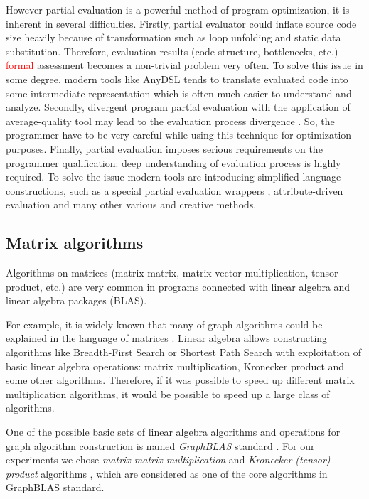 \documentclass[conference]{IEEEtran}
\begin{document}
However partial evaluation is a powerful method of program optimization, it is inherent in several difficulties. Firstly, partial evaluator could inflate source code size heavily because of transformation such as loop unfolding and static data substitution. Therefore, evaluation results (code structure, bottlenecks, etc.) \textcolor{red}{formal} assessment becomes a non-trivial problem very often. To solve this issue in some degree, modern tools like AnyDSL \cite{leissa2018anydsl} tends to translate evaluated code into some intermediate representation which is often much easier to understand and analyze. Secondly, divergent program partial evaluation with the application of average-quality tool may lead to the evaluation process divergence \cite{jones1993partial}. So, the programmer have to be very careful while using this technique for optimization purposes. Finally, partial evaluation imposes serious requirements on the programmer qualification: deep understanding of evaluation process is highly required. To solve the issue modern tools are introducing simplified language constructions, such as a special partial evaluation wrappers \cite{leissa2018anydsl}, attribute-driven evaluation \cite{10.1007/978-3-319-74313-4_27} and many other various and creative methods.

\subsection{Matrix algorithms}

Algorithms on matrices (matrix-matrix, matrix-vector multiplication, tensor product, etc.) are very common in programs connected with linear algebra and linear algebra packages (BLAS).

For example, it is widely known that many of graph algorithms could be explained in the language of matrices \cite{kepner2011graph,davis2019algorithm}. Linear algebra allows constructing algorithms like Breadth-First Search or Shortest Path Search with exploitation of basic linear algebra operations: matrix multiplication, Kronecker product and some other algorithms. Therefore, if it was possible to speed up different matrix multiplication algorithms, it would be possible to speed up a large class of algorithms. 

One of the possible basic sets of linear algebra algorithms and operations for graph algorithm construction is named \textit{GraphBLAS} standard \cite{davis2019algorithm,moreira2018implementing}. For our experiments we chose \textit{matrix-matrix multiplication} and \textit{Kronecker (tensor) product} algorithms \cite{cormen2009introduction}, which are considered as one of the core algorithms in GraphBLAS standard.
\end{document}
